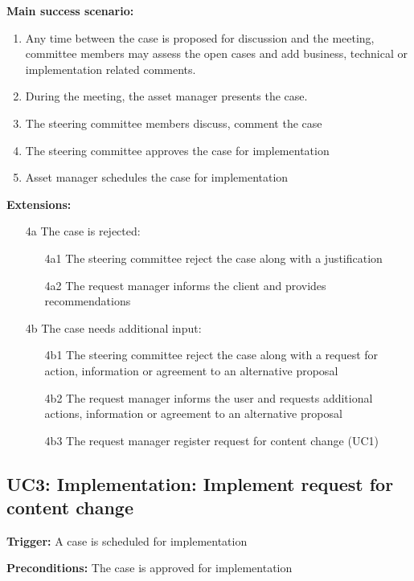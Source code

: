 	\textbf{Main success scenario:}
	
	\begin{enumerate}
		\item Any time between the case is proposed for discussion and the meeting, committee members may assess the open cases and add business, technical or implementation related comments. 
		\item During the meeting, the asset manager presents the case.
		\item The steering committee members discuss, comment the case
		\item The steering committee approves the case for implementation
		\item Asset manager schedules the case for implementation		
	\end{enumerate}
	\textbf{Extensions:}
	\begin{enumerate}
		\item [4a] The case is rejected:
		\begin{enumerate}
			\item [4a1] The steering committee reject the case along with a justification
			\item [4a2] The request manager informs the client and provides recommendations			
		\end{enumerate}
		\item [4b] The case needs additional input:
		\begin{enumerate}
			\item [4b1]  The steering committee reject the case along with a request for action, information or agreement to an alternative proposal
			\item [4b2] The request manager informs the user and requests additional actions, information or agreement to an alternative proposal
			\item [4b3] The request manager register request for content change (UC1)
		\end{enumerate}
	\end{enumerate}

	\subsection{UC3: Implementation: Implement request for content change}
	\label{sec:uc3}
	
	\textbf{Trigger:} A case is scheduled for implementation
	
	\textbf{Preconditions:} The case is approved for implementation
	
